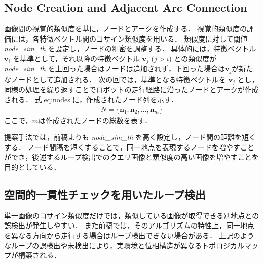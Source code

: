 \documentclass[conference]{IEEEtran}
\begin{document}
\subsection{Node Creation and Adjacent Arc Connection}

画像間の視覚的類似度を基に，ノードとアークを作成する．
視覚的類似度の評価には，各特徴ベクトル間のコサイン類似度を用いる．
類似度に対して閾値 \textit{node\_sim\_th} を設定し，ノードの粗密を調整する．
具体的には，特徴ベクトル $\bm{v}_i$ を基準として，それ以降の特徴ベクトル $\bm{v}_j$ ($j>i$) との類似度が \textit{node\_sim\_th} を上回った場合はノードは追加されず，下回った場合は$\bm{v}_j$が新たなノードとして追加される．
次の回では，基準となる特徴ベクトルを $\bm{v}_j$ とし，同様の処理を繰り返すことでロボットの走行経路に沿ったノードとアークが作成される．
式\eqref{eq:nodes}に，作成されたノード列を示す．
\begin{align}
  N = \{\bm{n}_1, \bm{n}_2, \ldots, \bm{n}_m\}
  \label{eq:nodes}
\end{align}
ここで，$m$は作成されたノードの総数を表す．

提案手法では，前稿\cite{ref:robosym_ogiwara}よりも \textit{node\_sim\_th} を高く設定し，ノード間の距離を短くする．
ノード間隔を短くすることで，同一地点を表現するノードを増やすことができ，後述するループ検出でのクエリ画像と類似度の高い画像を増やすことを目的としている．

\subsection{空間的一貫性チェックを用いたループ検出}

単一画像のコサイン類似度だけでは，類似している画像が取得できる別地点との誤検出が発生しやすい．
また前稿\cite{ref:robosym_ogiwara}では，そのアルゴリズムの特性上，同一地点を異なる方向から走行する場合はループ検出できない場合がある．
上記のようなループの誤検出や未検出により，実環境と位相構造が異なるトポロジカルマップが構築される．
\end{document}
